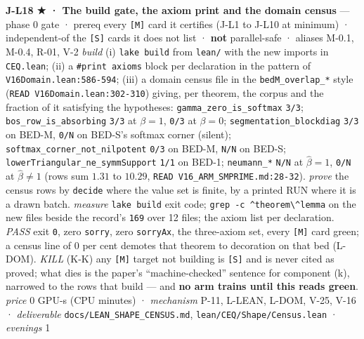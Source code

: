 \documentclass[11pt,a4paper]{article}
\theoremstyle{plain}
\theoremstyle{definition}
\theoremstyle{remark}
\begin{document}
\textbf{J-L18 ★ · The build gate, the axiom print and the domain census}
--- phase 0 gate · prereq every \texttt{{[}M{]}} card it certifies (J-L1
to J-L10 at minimum) · independent-of the \texttt{{[}S{]}} cards it does
not list · \textbf{not} parallel-safe · aliases M-0.1, M-0.4, R-01, V-2
\emph{build} (i) \texttt{lake\ build} from \texttt{lean/} with the new
imports in \texttt{CEQ.lean}; (ii) a \texttt{\#print\ axioms} block per
declaration in the pattern of \texttt{V16Domain.lean:586-594}; (iii) a
domain census file in the \texttt{bedM\_overlap\_*} style
(\texttt{READ\ V16Domain.lean:302-310}) giving, per theorem, the corpus
and the fraction of it satisfying the hypotheses:
\texttt{gamma\_zero\_is\_softmax} \texttt{3/3};
\texttt{bos\_row\_is\_absorbing} \texttt{3/3} at \(\beta=1\),
\texttt{0/3} at \(\beta=0\); \texttt{segmentation\_blockdiag}
\texttt{3/3} on BED-M, \texttt{0/N} on BED-S's softmax corner (silent);
\texttt{softmax\_corner\_not\_nilpotent} \texttt{0/3} on BED-M,
\texttt{N/N} on BED-S; \texttt{lowerTriangular\_ne\_symmSupport}
\texttt{1/1} on BED-1; \texttt{neumann\_*} \texttt{N/N} at
\(\hat\beta=1\), \texttt{0/N} at \(\hat\beta\ne1\) (rows sum \(1.31\) to
\(10.29\), \texttt{READ\ V16\_ARM\_SMPRIME.md:28-32}). \emph{prove} the
census rows by \texttt{decide} where the value set is finite, by a
printed RUN where it is a drawn batch. \emph{measure}
\texttt{lake\ build} exit code;
\texttt{grep\ -c\ \textquotesingle{}\^{}theorem\textbackslash{}\textbar{}\^{}lemma\textquotesingle{}}
on the new files beside the record's \texttt{169} over 12 files; the
axiom list per declaration. \emph{PASS} exit \texttt{0}, zero
\texttt{sorry}, zero \texttt{sorryAx}, the three-axiom set, every
\texttt{{[}M{]}} card green; a census line of \(0\) per cent demotes
that theorem to decoration on that bed (L-DOM). \emph{KILL} (K-K) any
\texttt{{[}M{]}} target not building is \texttt{{[}S{]}} and is never
cited as proved; what dies is the paper's ``machine-checked'' sentence
for component (k), narrowed to the rows that build --- and \textbf{no
arm trains until this reads green}. \emph{price} \(0\) GPU-s (CPU
minutes) · \emph{mechanism} P-11, L-LEAN, L-DOM, V-25, V-16 ·
\emph{deliverable} \texttt{docs/LEAN\_SHAPE\_CENSUS.md},
\texttt{lean/CEQ/Shape/Census.lean} · \emph{evenings} 1
\end{document}
